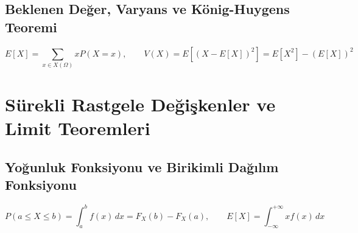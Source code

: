 \documentclass[11pt,a4paper]{report}
\begin{document}
\section{Beklenen Değer, Varyans ve König-Huygens Teoremi}
\[ E[X] = \sum_{x \in X(\Omega)} x P(X=x), \qquad V(X) = E[(X - E[X])^2] = E[X^2] - (E[X])^2 \]

\chapter{Sürekli Rastgele Değişkenler ve Limit Teoremleri}
\section{Yoğunluk Fonksiyonu ve Birikimli Dağılım Fonksiyonu}
\[ P(a \le X \le b) = \int_a^b f(x)\,dx = F_X(b) - F_X(a), \qquad E[X] = \int_{-\infty}^{+\infty} x f(x)\,dx \]
\end{document}
